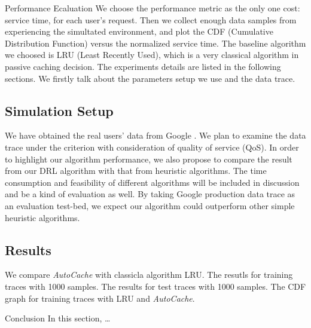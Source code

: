 \documentclass{article}
\begin{document}
\begin{section}{Performance Ecaluation}
    \label{exp}
    We choose the performance metric as the only one cost: service time, for each user's request. Then we collect enough data samples from experiencing the simultated environment, and plot the CDF (Cumulative Distribution Function) versus the normalized service time.
    The baseline algorithm we choosed is LRU (Least Recently Used), which is a very classical algorithm in passive caching decision.
    The experiments details are listed in the following sections. We firstly talk about the parameters setup we use and the data trace.

    \subsection{Simulation Setup}
    We have obtained the real users' data from Google \cite{clusterdata:Reiss2011}. We plan to examine the data trace under the criterion with consideration of quality of service (QoS). In order to highlight our algorithm performance, we also propose to compare the result from our DRL algorithm with that from heuristic algorithms. The time consumption and feasibility of different algorithms will be included in discussion and be a kind of evaluation as well. By taking Google production data trace as an evaluation test-bed, we expect our algorithm could outperform other simple heuristic algorithms.

    \subsection{Results}
    We compare \textit{AutoCache} with classicla algorithm LRU.
    The resutls for training traces with 1000 samples.
    The results for test traces with 1000 samples.
    The CDF graph for training traces with LRU and \textit{AutoCache}.
\end{section}

\begin{section}{Conclusion}
    \label{summary}
    In this section, \dots
\end{section}




\end{document}
